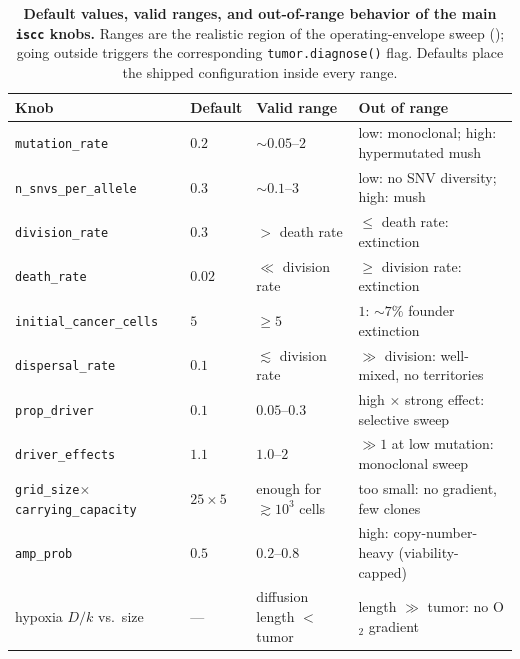 \documentclass{article}
\begin{document}
\begin{table}[t]
  \centering
  \footnotesize
  \setlength{\tabcolsep}{5pt}
  \caption{\textbf{Default values, valid ranges, and out-of-range behavior of the main \texttt{iscc}
  knobs.} Ranges are the realistic region of the operating-envelope sweep ();
  going outside triggers the corresponding \texttt{tumor.diagnose()} flag. Defaults place the shipped
  configuration inside every range.}
  \label{tab:envelope}
  \begin{tabular}{l l l l}
    \toprule
    Knob & Default & Valid range & Out of range \\
    \midrule
    \texttt{mutation\_rate}        & $0.2$  & $\sim$$0.05$--$2$ & low: monoclonal; high: hypermutated mush \\
    \texttt{n\_snvs\_per\_allele}  & $0.3$  & $\sim$$0.1$--$3$  & low: no SNV diversity; high: mush \\
    \texttt{division\_rate}        & $0.3$  & $>$ death rate    & $\le$ death rate: extinction \\
    \texttt{death\_rate}           & $0.02$ & $\ll$ division rate & $\ge$ division rate: extinction \\
    \texttt{initial\_cancer\_cells}& $5$    & $\ge 5$           & $1$: $\sim$$7\%$ founder extinction \\
    \texttt{dispersal\_rate}       & $0.1$  & $\lesssim$ division rate & $\gg$ division: well-mixed, no territories \\
    \texttt{prop\_driver}          & $0.1$  & $0.05$--$0.3$     & high $\times$ strong effect: selective sweep \\
    \texttt{driver\_effects}       & $1.1$  & $1.0$--$2$        & $\gg 1$ at low mutation: monoclonal sweep \\
    \texttt{grid\_size}$\times$\texttt{carrying\_capacity} & $25\times5$ & enough for $\gtrsim$$10^3$ cells & too small: no gradient, few clones \\
    \texttt{amp\_prob}             & $0.5$  & $0.2$--$0.8$      & high: copy-number-heavy (viability-capped) \\
    hypoxia $D/k$ vs.\ size        & ---    & diffusion length $<$ tumor & length $\gg$ tumor: no O$_2$ gradient \\
    \bottomrule
  \end{tabular}
\end{table}
\end{document}
